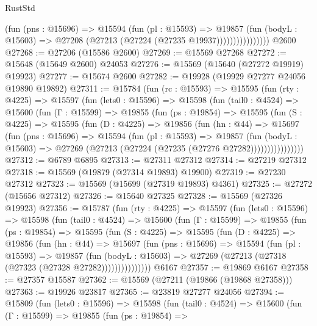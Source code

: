 \begin{lexlean}{RustStd}
\begin{coremodule}
                        (fun (pns : @15696) =>
                        @15594
                          (fun (pl : @15593) =>
                          @19857
                            (fun (bodyL : @15603) =>
                            @27208 (@27213 (@27224 (@27235 @19937))))))))))))))))
    @2600
@27268 := @27206 (@15586 @2600)
@27269 := @15569 @27268
@27272 := @15648 (@15649 @2600) @24053
@27276 := @15569 (@15640 (@27272 @19919) @19923)
@27277 := @15674 @2600
@27282 := @19928 (@19929 @27277 @24056 @19890 @19892)
@27311 := @15784
    (fun (rc : @15593) =>
    @15595
      (fun (rty : @4225) =>
      @15597
        (fun (lets0 : @15596) =>
        @15598
          (fun (tail0 : @4524) =>
          @15600
            (fun (Γ : @15599) =>
            @19855
              (fun (ps : @19854) =>
              @15595
                (fun (S : @4225) =>
                @15595
                  (fun (D : @4225) =>
                  @19856
                    (fun (hn : @44) =>
                    @15697
                      (fun (pns : @15696) =>
                      @15594
                        (fun (pl : @15593) =>
                        @19857
                          (fun (bodyL : @15603) =>
                          @27269 (@27213 (@27224 (@27235 (@27276 @27282))))))))))))))))
@27312 := @6789 @6895
@27313 := @27311 @27312
@27314 := @27219 @27312
@27318 := @15569 (@19879 (@27314 @19893) @19900)
@27319 := @27230 @27312
@27323 := @15569 (@15699 (@27319 @19893) @4361)
@27325 := @27272 (@15656 @27312)
@27326 := @15640 @27325
@27328 := @15569 (@27326 @19923)
@27356 := @15787
    (fun (rty : @4225) =>
    @15597
      (fun (lets0 : @15596) =>
      @15598
        (fun (tail0 : @4524) =>
        @15600
          (fun (Γ : @15599) =>
          @19855
            (fun (ps : @19854) =>
            @15595
              (fun (S : @4225) =>
              @15595
                (fun (D : @4225) =>
                @19856
                  (fun (hn : @44) =>
                  @15697
                    (fun (pns : @15696) =>
                    @15594
                      (fun (pl : @15593) =>
                      @19857
                        (fun (bodyL : @15603) =>
                        @27269 (@27213 (@27318 (@27323 (@27328 @27282)))))))))))))))
    @6167
@27357 := @19869 @6167
@27358 := @27357 @15587
@27362 := @15569 (@27211 (@19866 (@19868 @27358)))
@27363 := @19926 @23817
@27365 := @23819 @27277 @24056
@27394 := @15809
    (fun (lets0 : @15596) =>
    @15598
      (fun (tail0 : @4524) =>
      @15600
        (fun (Γ : @15599) =>
        @19855
          (fun (ps : @19854) =>

\end{coremodule}
\end{lexlean}
